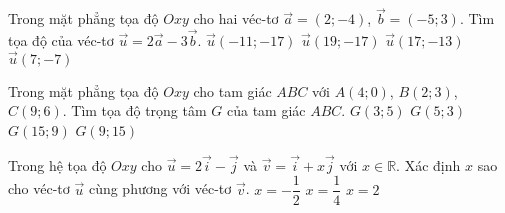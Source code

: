 \begin{ex}%
	Trong mặt phẳng tọa độ $Oxy$ cho hai véc-tơ $ \vec{a}= (2; -4)$, $ \vec{b}=(-5; 3)$. Tìm tọa độ của véc-tơ $ \vec{u}= 2\vec{a}-3\vec{b}$.
	\choice
	{$\vec{u}(-11; -17)$}
	{\True $\vec{u}(19; -17)$}
	{$\vec{u}(17; -13)$}
	{$\vec{u}(7; -7)$}
\end{ex}
\begin{ex}%
	Trong mặt phẳng tọa độ $Oxy$ cho tam giác $ABC$ với $A(4;0)$, $B(2;3)$, $C(9;6)$. Tìm tọa độ trọng tâm $G$ của tam giác $ABC$.
	\choice
	{$G(3;5)$}
	{\True $G(5;3)$}
	{$G(15;9)$}
	{$G(9; 15)$}
\end{ex}
\begin{ex}%
	Trong hệ tọa độ $Oxy$ cho $\vec{u}= 2\vec{i}- \vec{j}$ và $ \vec{v}= \vec{i}+ x\vec{j}$ với $x\in\mathbb{R}$. Xác định $x$ sao cho véc-tơ $ \vec{u}$ cùng phương với véc-tơ $\vec{v}$.
	{\True $x= -\dfrac{1}{2} $}
	{$x= \dfrac{1}{4} $}
	{$x= 2$}
\end{ex}

